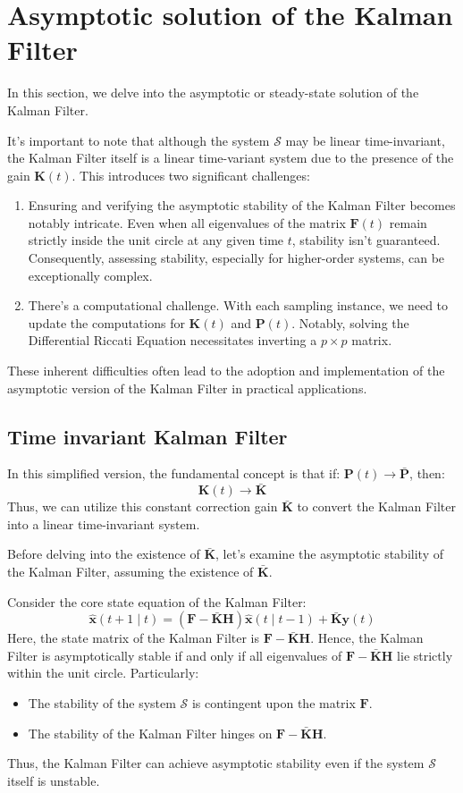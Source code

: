 \section{Asymptotic solution of the Kalman Filter}

In this section, we delve into the asymptotic or steady-state solution of the Kalman Filter.

It's important to note that although the system $\mathcal{S}$ may be linear time-invariant, the Kalman Filter itself is a linear time-variant system due to the presence of the gain $\mathbf{K}(t)$. 
This introduces two significant challenges:
\begin{enumerate}
    \item Ensuring and verifying the asymptotic stability of the Kalman Filter becomes notably intricate. 
        Even when all eigenvalues of the matrix $\mathbf{F}(t)$ remain strictly inside the unit circle at any given time $t$, stability isn't guaranteed. 
        Consequently, assessing stability, especially for higher-order systems, can be exceptionally complex.
    \item There's a computational challenge. 
        With each sampling instance, we need to update the computations for $\mathbf{K}(t)$ and $\mathbf{P}(t)$. 
        Notably, solving the Differential Riccati Equation necessitates inverting a $p \times p$ matrix.
\end{enumerate}
These inherent difficulties often lead to the adoption and implementation of the asymptotic version of the Kalman Filter in practical applications.

\subsection{Time invariant Kalman Filter}
In this simplified version, the fundamental concept is that if: $\mathbf{P}(t)\rightarrow \bar{\mathbf{P}}$, then: 
\[\mathbf{K}(t)\rightarrow \bar{\mathbf{K}}\]
Thus, we can utilize this constant correction gain $\bar{\mathbf{K}}$ to convert the Kalman Filter into a linear time-invariant system.

Before delving into the existence of $\bar{\mathbf{K}}$, let's examine the asymptotic stability of the Kalman Filter, assuming the existence of $\bar{\mathbf{K}}$.

Consider the core state equation of the Kalman Filter:
\[\hat{\mathbf{x}}(t+1\mid t)  =\left(\mathbf{F}-\bar{\mathbf{K}}\mathbf{H}\right)\hat{\mathbf{x}}(t\mid t-1)+\bar{\mathbf{K}}\mathbf{y}(t)\]
Here, the state matrix of the Kalman Filter is $\mathbf{F}-\bar{\mathbf{K}}\mathbf{H}$. 
Hence, the Kalman Filter is asymptotically stable if and only if all eigenvalues of $\mathbf{F}-\bar{\mathbf{K}}\mathbf{H}$ lie strictly within the unit circle. 
Particularly:
\begin{itemize}
    \item The stability of the system $\mathcal{S}$ is contingent upon the matrix $\mathbf{F}$.
    \item The stability of the Kalman Filter hinges on $\mathbf{F}-\bar{\mathbf{K}}\mathbf{H}$.
\end{itemize}
Thus, the Kalman Filter can achieve asymptotic stability even if the system $\mathcal{S}$ itself is unstable.